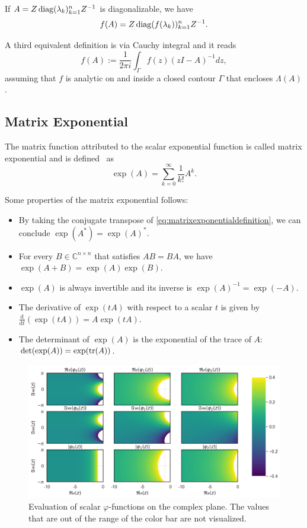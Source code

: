 If $A = Z \operatorname{diag}(\lambda_k)_{k=1}^{n} Z^{-1}$ is diagonalizable, we have
\begin{equation}
    \label{eq:matrixfunctiondiagonal}
    f(A) = Z \operatorname{diag}(f(\lambda_k))_{k=1}^{n} Z^{-1}.
\end{equation}

A third equivalent definition is via Cauchy integral and it reads
\begin{equation}
    f(A) := \frac{1}{2 \pi i} \int_{\Gamma}{f(z)(zI - A)^{-1} dz},
\end{equation}
assuming that $f$ is analytic on and inside a closed contour $\Gamma$ that encloses $\Lambda(A)$.

\subsection{Matrix Exponential}
The matrix function attributed to the scalar exponential function is called
matrix exponential and is defined~\cite{higham2008functions} as
\begin{equation}
    \label{eq:matrixexponentialdefinition}
    \exp(A) = \sum_{k=0}^{\infty}{\frac{1}{k!} A^k}.
\end{equation}

Some properties of the matrix exponential follows:
\begin{itemize}
    \item By taking the conjugate transpose of \eqref{eq:matrixexponentialdefinition},
        we can conclude $\exp(A^{*}) = \exp(A)^{*}$.
    \item For every $B \in \mathbb{C}^{n \times n}$ that satisfies $AB = BA$,
        we have $\exp(A + B) = \exp(A) \exp(B)$.
    \item $\exp(A)$ is always invertible and its inverse is $\exp(A)^{-1} = \exp(-A)$.
    \item The derivative of $\exp(tA)$ with respect to a scalar $t$ is given by
        $\frac{\mathrm{d}}{\mathrm{d} t} (\exp(tA)) = A \exp(tA)$.
    \item The determinant of $\exp(A)$ is the exponential of the trace of
        $A$: $\det(\exp(A)) = \exp(\trace(A))$.
\end{itemize}

\begin{figure}[h]
    \centering
    \includegraphics[width=.7\textwidth]{img/scalarcomplexplane.png}
    \caption{
        Evaluation of scalar $\varphi$-functions on the complex plane.
        The values that are out of the range of the color bar are not visualized.
        }
    \label{fig:scalarphifunctionscomplexplane}
\end{figure}


